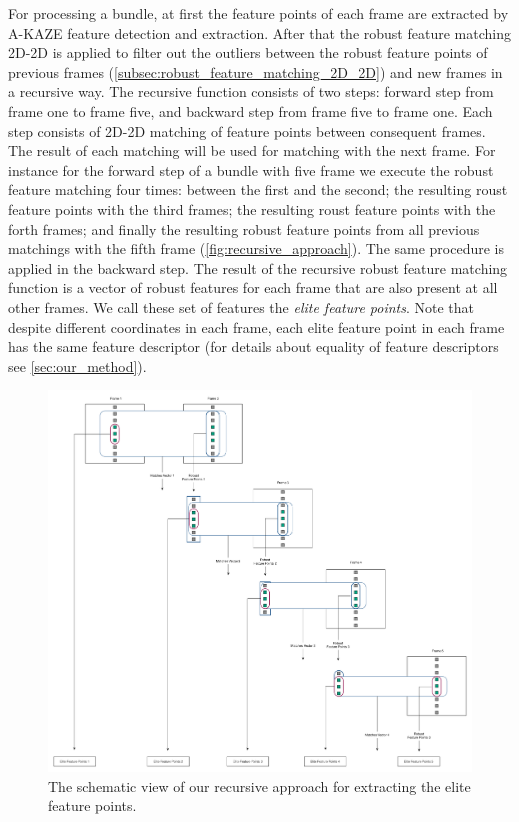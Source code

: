 For processing a bundle, at first the feature points of each frame are extracted by A-KAZE feature detection and extraction. 
After that the robust feature matching 2D-2D is applied to filter out the outliers between the robust feature points of previous frames (\autoref{subsec:robust_feature_matching_2D_2D}) and new frames in a recursive way. 
The recursive function consists of two steps: forward step from frame one to frame five, and backward step from frame five to frame one. Each step consists of 2D-2D matching of feature points between consequent frames. The result of each matching will be used for matching with the next frame. For instance for the forward step of a bundle with five frame we execute the robust feature matching four times: between the first and the second; the resulting roust feature points with the third frames; the resulting roust feature points with the forth frames; and finally the resulting robust feature points from all previous matchings with the fifth frame (\autoref{fig:recursive_approach}). The same procedure is applied in the backward step. 
The result of the recursive robust feature matching function is a vector of robust features for each frame that are also present at all other frames. We call these set of features the \textit{elite feature points}. Note that despite different coordinates in each frame, each elite feature point in each frame has the same feature descriptor (for details about equality of feature descriptors see \autoref{sec:our_method}). 

\begin{figure}[H]
  \centering
  \includegraphics[width=\textwidth]{figures/recursive_approach}
  \caption{The schematic view of our recursive approach for extracting the elite feature points.} \label{fig:recursive_approach}
\end{figure}
 
